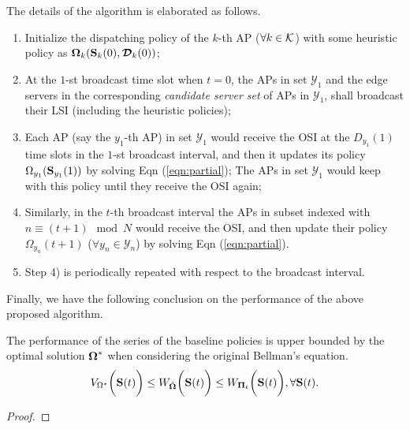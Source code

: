 The details of the algorithm is elaborated as follows.
\begin{enumerate}
    \item Initialize the dispatching policy of the $k$-th AP ($\forall k\in\mathcal{K}$) with some heuristic policy as $\boldsymbol{\Omega}_{k}(\mathbf{S}_{k}(0), \boldsymbol{\mathcal{D}}_{k}(0))$;
    \item At the $1$-st broadcast time slot when $t=0$, the APs in set $\mathcal{Y}_{1}$ and the edge servers in the corresponding \emph{candidate server set} of APs in $\mathcal{Y}_{1}$, shall broadcast their LSI (including the heuristic policies);
    \item Each AP (say the $y_1$-th AP) in set $\mathcal{Y}_{1}$ would receive the OSI at the $D_{y_1}(1)$ time slots in the $1$-st broadcast interval, and then it updates its policy $\Omega_{y_1}(\mathbf{S}_{y_1}(1))$ by solving Eqn (\ref{eqn:partial}); The APs in set $\mathcal{Y}_{1}$ would keep with this policy until they receive the OSI again;
    \item Similarly, in the $t$-th broadcast interval the APs in subset indexed with $n \equiv (t + 1)\mod{N}$ would receive the OSI, and then update their policy $\Omega_{y_n}(t+1)$ ($\forall y_n\in\mathcal{Y}_{n}$) by solving Eqn (\ref{eqn:partial}).
    \item Step 4) is periodically repeated with respect to the broadcast interval.
\end{enumerate}




Finally, we have the following conclusion on the performance of the above proposed algorithm.
\begin{lemma}[Performance Guarantee]
    The performance of the series of the baseline policies is upper bounded by the optimal solution $\boldsymbol{\Omega}^*$ when considering the original Bellman's equation.
    \begin{align}
        V_{\Omega^*}\bigg(\mathbf{S}(t)\bigg)
        \leq W_{\tilde{\boldsymbol{\Omega}}}\bigg(\mathbf{S}(t)\bigg)
        \leq W_{\boldsymbol{\Pi}_{t}}\bigg(\mathbf{S}(t)\bigg),
        \forall \mathbf{S}(t).
    \end{align}
\end{lemma}
\begin{proof}
    
\end{proof}

